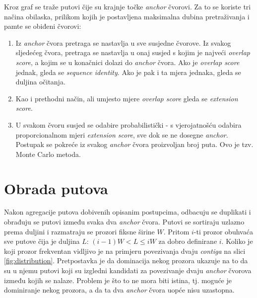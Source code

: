 \documentclass[times, utf8, seminar, numeric]{fer}
\begin{document}
\noindent
Kroz graf se traže putovi čije su krajnje točke \textit{anchor} čvorovi. Za to se koriste tri načina obilaska, prilikom kojih je postavljena maksimalna dubina pretraživanja i pamte se obiđeni čvorovi:
\begin{enumerate}
	\item Iz \textit{anchor} čvora pretraga se nastavlja u sve susjedne čvorove. Iz svakog sljedećeg čvora, pretraga se nastavlja u onaj susjed s kojim je najveći \textit{overlap score}, a kojim se u konačnici dolazi do \textit{anchor} čvora. Ako je \textit{overlap score} jednak, gleda se \textit{sequence identity}. Ako je pak i ta mjera jednaka, gleda se duljina očitanja.
	\item Kao i prethodni način, ali umjesto mjere \textit{overlap score} gleda se \textit{extension score}.
	\item U svakom čvoru susjed se odabire probabilistički - s vjerojatnošću odabira proporcionalnom mjeri \textit{extension score}, sve dok se ne dosegne \textit{anchor}. Postupak se pokreće iz svakog \textit{anchor} čvora proizvoljan broj puta. Ovo je tzv. Monte Carlo metoda.
\end{enumerate}

\section{Obrada putova}
Nakon agregacije putova dobivenih opisanim postupcima, odbacuju se duplikati i obrađuju se putovi između svaka dva \textit{anchor} čvora. Putovi se sortiraju uzlazno prema duljini i razmatraju se prozori fiksne širine $W$. Pritom $i$-ti prozor obuhvaća sve putove čija je duljina $L$: $(i-1)W < L \le iW$ za dobro definirane $i$. Koliko je koji prozor frekventan vidljivo je na primjeru povezivanja dvaju \textit{contiga} na slici \ref{fig:distribution}. Pretpostavka je da dominacija nekog prozora ukazuje na to da su u njemu putovi koji su izgledni kandidati za povezivanje dvaju \textit{anchor} čvorova između kojih se nalaze. Problem je što to ne mora biti istina, tj. moguće je dominiranje nekog prozora, a da ta dva \textit{anchor} čvora uopće nisu uzastopna.
\end{document}
